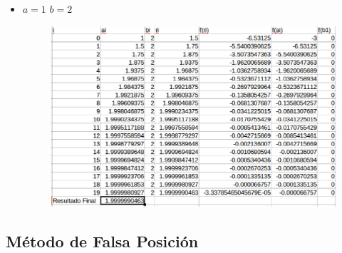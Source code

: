 \documentclass[a4paper,12pt]{article}
\begin{document}
\begin{itemize}
\begin{itemize}
       \item $a = 1$ $b = 2$
       
	\begin{figure}[h]
      \centering
      \includegraphics[scale = 0.4]{233.eps}
     \end{figure} 
      \end{itemize}
    \end{itemize}

   
    
    
    \subsection{Método de Falsa Posición}
     
\end{document}
